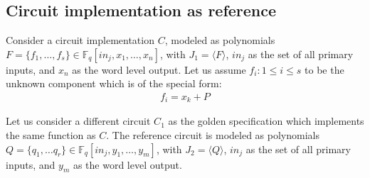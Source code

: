 

\subsection{Circuit implementation as reference}
Consider a circuit implementation $C$, modeled as polynomials $F = \{f_1,\dots,f_s\}\in \mathbb{F}_q[in_j,x_1,\dots, x_n]$, with $J_1=\langle F \rangle$, $in_j$ as the set of all primary inputs, and $x_n$ as the word level output. Let us assume $f_i:1\le i \le s$ to be the unknown component which is of the special form:
\begin{gather*} 
f_i = x_k + P
\end{gather*}

Let us consider a different circuit $C_1$ as the golden specification which implements the same function as $C$. The reference circuit is modeled as polynomials $Q = \{q_1,\dots q_r\}\in \mathbb{F}_q[in_j,y_1,\dots, y_m]$, with $J_2=\langle Q \rangle$, $in_j$ as the set of all primary inputs, and $y_m$ as the word level output.

